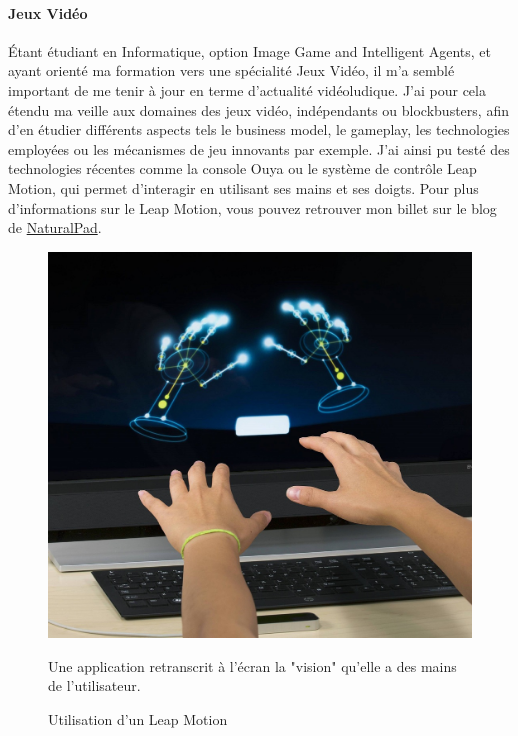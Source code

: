 \paragraph{Jeux Vidéo\\ \quad}
Étant étudiant en Informatique, option Image Game and Intelligent Agents, et ayant orienté ma formation vers une spécialité Jeux Vidéo, il m'a semblé important de me tenir à jour en terme d'actualité vidéoludique. J'ai pour cela étendu ma veille aux domaines des jeux vidéo, indépendants ou blockbusters, afin d'en étudier différents aspects tels le business model, le gameplay, les technologies employées ou les mécanismes de jeu innovants par exemple. J'ai ainsi pu testé des technologies récentes comme la console Ouya ou le système de contrôle Leap Motion, qui permet d'interagir en utilisant ses mains et ses doigts. Pour plus d'informations sur le Leap Motion, vous pouvez retrouver mon billet sur le blog de \href{naturalpad.fr/category/naturalblog}{NaturalPad}.
\begin{figure}
	\centering
	\includegraphics{images/leap_motion.jpg}
	\caption{Utilisation d'un Leap Motion}Une application retranscrit à l'écran la "vision" qu'elle a des mains de l'utilisateur.
	\label{leapmotion}
\end{figure}

